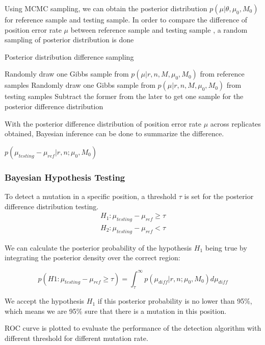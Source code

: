 \documentclass[11pt,reqno]{amsart}
\begin{document}
Using MCMC sampling, we can obtain the posterior distribution $p \left( \mu |\theta,\mu_0,M_0\right)$ for reference sample and testing sample. In order to compare the difference of position error rate $\mu$ between reference sample and testing sample , a random sampling of posterior distribution is done 
\begin{algorithm}
\caption{Posterior distribution difference sampling}
\begin{algorithmic}[1]
\Procedure{}{}
\Repeat
\State  Randomly  draw one Gibbs sample from $p \left( \mu |r, n, M, \mu_0, M_0\right)$ from reference samples
\State  Randomly draw one Gibbs sample from $p \left( \mu |r, n, M, \mu_0,M_0\right) $ from testing samples
\State Subtract the former from the later to get one sample for the posterior difference distribution 
\EndProcedure
\end{algorithmic}
\end{algorithm}

With the posterior difference distribution of position error rate $\mu$ across replicates obtained, Bayesian inference can be done to summarize the difference. 

$p \left( \mu_{testing}-\mu_{ref} |r,n; \mu_0,M_0\right)$

\subsubsection{Bayesian Hypothesis Testing}
To detect a mutation in a specific position, a threshold $\tau$ is set for the posterior difference distribution testing.
\begin{align}
 H_1: \mu_{testing}-\mu_{ref}\geq\tau \\
 H_2: \mu_{testing}-\mu_{ref}<\tau
\end{align}

We can calculate the posterior probability of the hypothesis $H_1$ being true by integrating the posterior density over the correct region:

\begin{equation}
 p(H1:\mu_{testing}-\mu_{ref}\geq\tau)=\int_\tau^\infty p(\mu_{diff} |r,n; \mu_0,M_0)d\mu_{diff}
\end{equation}

We accept the hypothesis $H_1$ if this posterior probability is no lower than 95\%, which means we are 95\% sure that there is a mutation in this position.

ROC curve is plotted to evaluate the performance of the detection algorithm with different threshold for different mutation rate. 
\end{document}
